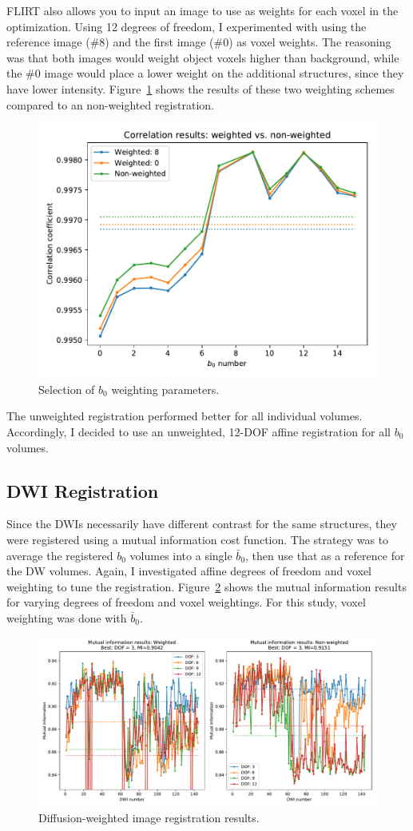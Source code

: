 \documentclass{article}
\begin{document}
FLIRT also allows you to input an image to use as weights for each voxel in the
optimization. Using 12 degrees of freedom, I experimented with using the reference
image (\#8) and the first image (\#0) as voxel weights. The reasoning was that
both images would weight object voxels higher than background, while the
\#0 image would place a lower weight on the additional structures, since they have
lower intensity. Figure~\ref{fig:b0_weight_results} shows the results of these
two weighting schemes compared to an non-weighted registration. 

\begin{figure}[h]
  \centering
  \includegraphics[width=0.5\linewidth]{figs/b0_weighted_vs_nw_results}
  \caption{Selection of $b_0$ weighting parameters.}
  \label{fig:b0_weight_results}
\end{figure}

The unweighted registration performed better for all individual volumes. Accordingly,
I decided to use an unweighted, 12-DOF affine registration for all $b_0$ volumes.

\subsection{DWI Registration}
Since the DWIs necessarily have different contrast for the same structures, they
were registered using a mutual information cost function. The strategy was to
average the registered $b_0$ volumes into a single $\bar{b}_0$, then use that as
a reference for the DW volumes. Again, I investigated affine degrees of freedom
and voxel weighting to tune the registration. Figure~\ref{fig:dwiresults} shows
the mutual information results for varying degrees of freedom and voxel
weightings. For this study, voxel weighting was done with $\bar{b}_0$. 

\begin{figure}[H]
  \centering
  \includegraphics[width=0.9\linewidth]{figs/dwi_MI_results}
  \caption{Diffusion-weighted image registration results.}
  \label{fig:dwiresults}
\end{figure}
\end{document}
